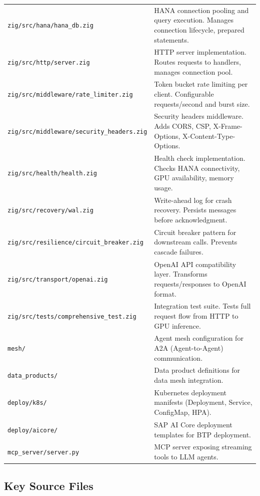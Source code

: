 \documentclass[11pt,a4paper]{article}
\begin{document}
\begin{longtable}{@{}L{6cm}L{8cm}@{}}
\texttt{zig/src/hana/hana\_db.zig} & HANA connection pooling and query execution. Manages connection lifecycle, prepared statements. \\
\texttt{zig/src/http/server.zig} & HTTP server implementation. Routes requests to handlers, manages connection pool. \\
\texttt{zig/src/middleware/rate\_limiter.zig} & Token bucket rate limiting per client. Configurable requests/second and burst size. \\
\texttt{zig/src/middleware/security\_headers.zig} & Security headers middleware. Adds CORS, CSP, X-Frame-Options, X-Content-Type-Options. \\
\texttt{zig/src/health/health.zig} & Health check implementation. Checks HANA connectivity, GPU availability, memory usage. \\
\texttt{zig/src/recovery/wal.zig} & Write-ahead log for crash recovery. Persists messages before acknowledgment. \\
\texttt{zig/src/resilience/circuit\_breaker.zig} & Circuit breaker pattern for downstream calls. Prevents cascade failures. \\
\texttt{zig/src/transport/openai.zig} & OpenAI API compatibility layer. Transforms requests/responses to OpenAI format. \\
\texttt{zig/src/tests/comprehensive\_test.zig} & Integration test suite. Tests full request flow from HTTP to GPU inference. \\
\texttt{mesh/} & Agent mesh configuration for A2A (Agent-to-Agent) communication. \\
\texttt{data\_products/} & Data product definitions for data mesh integration. \\
\texttt{deploy/k8s/} & Kubernetes deployment manifests (Deployment, Service, ConfigMap, HPA). \\
\texttt{deploy/aicore/} & SAP AI Core deployment templates for BTP deployment. \\
\texttt{mcp\_server/server.py} & MCP server exposing streaming tools to LLM agents. \\
\bottomrule
\end{longtable}

\subsection{Key Source Files}
\end{document}
